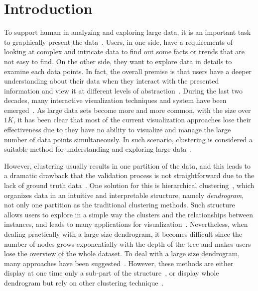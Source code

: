 \section{Introduction}
\label{sec:introduction}
To support human in analyzing and exploring large data, it is an important task to graphically present the data~\cite{yang2003interactive}. Users, in one side, have a requirements of looking at complex and intricate data to find out some facts or trends that are not easy to find. On the other side, they want to explore data in details to examine each data points. In fact, the overall premise is that users have a deeper understanding about their data when they interact with the presented information and view it at different levels of abstraction~\cite{roberts2007state}. During the last two decades, many interactive visualization techniques and system have been emerged~\cite{yang2003interactive,stroe2000scalable,fua2000structure}.
As large data sets become more and more common, with the size over $1K$, it has been clear that most of the current visualization approaches lose their effectiveness due to they have no ability to visualize and manage the large number of data points simultaneously. In such scenario, clustering is considered a suitable method for understanding and exploring large data~\cite{berkhin2006survey,bisson2012improving}. 

However, clustering usually results in one partition of the data, and this leads to a dramatic drawback that the validation process is not straightforward due to the lack of ground truth data~\cite{candillier2006casade}. One solution for this is hierarchical clustering~\cite{johnson1967hierarchical}, which organizes data in an intuitive and interpretable structure, namely \emph{dendrogram}, not only one partition as the traditional clustering methods.
Such structure allows users to explore in a simple way the clusters and the relationships between instances, and leads to many applications for visualization~\cite{heard2009novel,landesberger2011visual,mahe2009graph}.
Nevertheless, when dealing practically with a large size dendrogram, it becomes difficult since the number of nodes grows exponentially with the depth of the tree and makes users lose the overview of the whole dataset. To deal with a large size dendrogram, many approaches have been suggested~\cite{bisson2012improving,landesberger2011visual,furnas2006fisheye}. However, these methods are either display at one time only a sub-part of the structure~\cite{landesberger2011visual,furnas2006fisheye}, or display whole dendrogram but rely on other clustering technique~\cite{bisson2012improving}.

